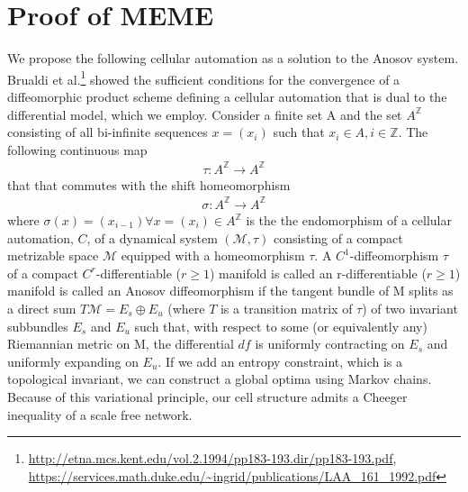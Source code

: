 \documentclass{article}
\begin{document}
\section{Proof of MEME}
We propose the following cellular automation as a solution to the Anosov system. Brualdi et al.\footnote{\url{http://etna.mcs.kent.edu/vol.2.1994/pp183-193.dir/pp183-193.pdf},\\ \url{https://services.math.duke.edu/~ingrid/publications/LAA_161_1992.pdf}} showed the sufficient conditions for the convergence of a diffeomorphic product scheme defining a cellular automation that is dual to the differential model, which we employ. Consider a finite set A and the set $A^{\mathbb{Z}}$ consisting of all bi-infinite sequences $x = (x_i)$ such that $x_i \in A, i\in\mathbb{Z}$. The following continuous map
\begin{equation} \label{eq1}
\begin{split}
\tau: A^{\mathbb{Z}} \rightarrow A^{\mathbb{Z}} 
\end{split}
\end{equation}
that that commutes with the shift homeomorphism
\begin{equation} \label{eq1}
\begin{split}
\sigma: A^{\mathbb{Z}} \rightarrow A^{\mathbb{Z}} 
\end{split}
\end{equation}
where $\sigma(x) = (x_{i-1}) \forall x = (x_i) \in A^{\mathbb{Z}}$ is the the endomorphism of a cellular automation, $C$, of a dynamical system $(\mathcal{M}, \tau)$ consisting of a compact metrizable space $\mathcal{M}$ equipped with a homeomorphism $\tau$. A $C^1$-diffeomorphism $\tau$ of a compact $C^r$-differentiable ($r \geq 1$) manifold  is called an r-differentiable ($r \geq 1$) manifold is called an Anosov diffeomorphism if the tangent bundle of M splits as a direct sum $T\mathcal{M} = E_s\oplus E_u$ (where $T$ is a transition matrix of $\tau$) of two invariant subbundles $E_s$ and $E_u$ such that, with respect to some (or equivalently any) Riemannian metric on M, the differential $df$ is uniformly contracting on $E_s$ and uniformly expanding on $E_u$. If we add an entropy constraint, which is a topological invariant, we can construct a global optima using Markov chains. Because of this variational principle, our cell structure admits a Cheeger inequality of a scale free network.
\end{document}
